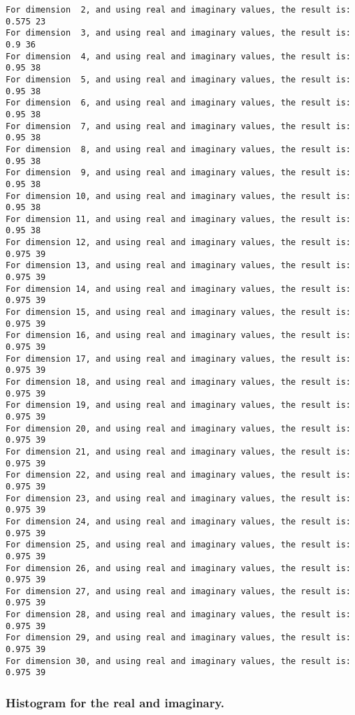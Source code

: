 \documentclass[11pt]{article}
\begin{document}
    \begin{Verbatim}[commandchars=\\\{\}]
For dimension  2, and using real and imaginary values, the result is: 0.575 23
For dimension  3, and using real and imaginary values, the result is: 0.9 36
For dimension  4, and using real and imaginary values, the result is: 0.95 38
For dimension  5, and using real and imaginary values, the result is: 0.95 38
For dimension  6, and using real and imaginary values, the result is: 0.95 38
For dimension  7, and using real and imaginary values, the result is: 0.95 38
For dimension  8, and using real and imaginary values, the result is: 0.95 38
For dimension  9, and using real and imaginary values, the result is: 0.95 38
For dimension 10, and using real and imaginary values, the result is: 0.95 38
For dimension 11, and using real and imaginary values, the result is: 0.95 38
For dimension 12, and using real and imaginary values, the result is: 0.975 39
For dimension 13, and using real and imaginary values, the result is: 0.975 39
For dimension 14, and using real and imaginary values, the result is: 0.975 39
For dimension 15, and using real and imaginary values, the result is: 0.975 39
For dimension 16, and using real and imaginary values, the result is: 0.975 39
For dimension 17, and using real and imaginary values, the result is: 0.975 39
For dimension 18, and using real and imaginary values, the result is: 0.975 39
For dimension 19, and using real and imaginary values, the result is: 0.975 39
For dimension 20, and using real and imaginary values, the result is: 0.975 39
For dimension 21, and using real and imaginary values, the result is: 0.975 39
For dimension 22, and using real and imaginary values, the result is: 0.975 39
For dimension 23, and using real and imaginary values, the result is: 0.975 39
For dimension 24, and using real and imaginary values, the result is: 0.975 39
For dimension 25, and using real and imaginary values, the result is: 0.975 39
For dimension 26, and using real and imaginary values, the result is: 0.975 39
For dimension 27, and using real and imaginary values, the result is: 0.975 39
For dimension 28, and using real and imaginary values, the result is: 0.975 39
For dimension 29, and using real and imaginary values, the result is: 0.975 39
For dimension 30, and using real and imaginary values, the result is: 0.975 39

    \end{Verbatim}

    \subsubsection{Histogram for the real and
imaginary.}\label{histogram-for-the-real-and-imaginary.}
\end{document}
